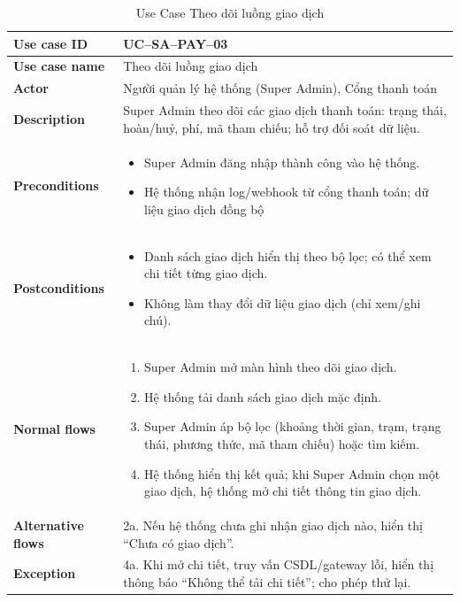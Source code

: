\begin{enumerate}[label=\textbf{\alph*)}]
\begin{itemize}
      \begin{center}
        \renewcommand{\arraystretch}{1.5}
        \begin{longtable}{|m{}|m{}|}
          \caption{Use Case Theo dõi luồng giao dịch}
          \label{tab:uc_sa_pay_03} \\
          \hline
          \textbf{Use case ID} & UC--SA--PAY--03 \\
          \hline
          \textbf{Use case name} & Theo dõi luồng giao dịch \\
          \hline
          \textbf{Actor} & Người quản lý hệ thống (Super Admin), Cổng thanh toán \\
          \hline
          \textbf{Description} & Super Admin theo dõi các giao dịch thanh toán: trạng thái, hoàn/huỷ, phí, mã tham chiếu; hỗ trợ đối soát dữ liệu.\\
          \hline
          \textbf{Preconditions} &
          \begin{itemize}
            \item Super Admin đăng nhập thành công vào hệ thống.
            \item Hệ thống nhận log/webhook từ cổng thanh toán; dữ liệu giao dịch đồng bộ
          \end{itemize}\\
          \hline
          \textbf{Postconditions} &
          \begin{itemize}
            \item Danh sách giao dịch hiển thị theo bộ lọc; có thể xem chi tiết từng giao dịch.
            \item Không làm thay đổi dữ liệu giao dịch (chỉ xem/ghi chú).
          \end{itemize}\\
          \hline
          \textbf{Normal flows} &
          \begin{enumerate}[label=\arabic*.]
            \item Super Admin mở màn hình theo dõi giao dịch.
            \item Hệ thống tải danh sách giao dịch mặc định.
            \item Super Admin áp bộ lọc (khoảng thời gian, trạm, trạng thái, phương thức, mã tham chiếu) hoặc tìm kiếm.
            \item Hệ thống hiển thị kết quả; khi Super Admin chọn một giao dịch, hệ thống mở chi tiết thông tin giao dịch.

          \end{enumerate}\\
          \hline
          \textbf{Alternative flows} &
          2a. Nếu hệ thống chưa ghi nhận giao dịch nào, hiển thị “Chưa có giao dịch”.\\
          \hline
          \textbf{Exception} &
          4a. Khi mở chi tiết, truy vấn CSDL/gateway lỗi,  hiển thị thông báo “Không thể tải chi tiết”; cho phép thử lại.\\
          \hline
          \end{longtable}
      \end{center}
  \end{itemize}


\end{enumerate}
